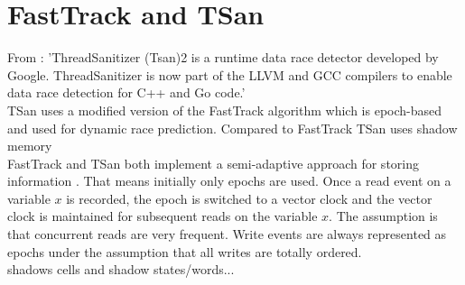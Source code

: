 \documentclass[12pt]{article}
\begin{document}
	\section{FastTrack and TSan}\label{fasttrack-sec}
	From \cite[p. 183]{lin}: 'ThreadSanitizer (Tsan)2 is a runtime data race detector developed by Google. ThreadSanitizer is now part of the LLVM and GCC compilers to enable data race detection for C++ and Go code.'\\
	TSan uses a modified version of the FastTrack algorithm which is epoch-based and used for dynamic race prediction. Compared to FastTrack TSan uses shadow memory \cite[p. 183]{lin}\cite[p. 4]{yu}\\
	FastTrack and TSan both implement a semi-adaptive approach for storing information \cite[p. 10]{sulzmann2}. That means initially only epochs are used. Once a read event on a variable $x$ is recorded, the epoch is switched to a vector clock and the vector clock is maintained for subsequent reads on the variable $x$. The assumption is that concurrent reads are very frequent. Write events are always represented as epochs under the assumption that all writes are totally ordered.\\
	shadows cells and shadow states/words...
\end{document}
